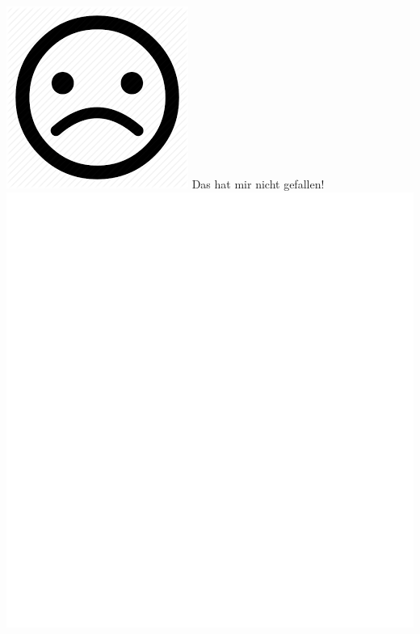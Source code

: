 \documentclass[oneside,openany,headings=optiontotoc,11pt,numbers=noenddot]{scrreprt}
\begin{document}
	\begin{framed}
		\noindent
		\includegraphics[scale=0.1]{ssmi.png} \tiny{\color{codegray}Das hat mir nicht gefallen!}\\
		\includegraphics[scale=0.15]{empty.jpg}
	\end{framed}
\end{document}
